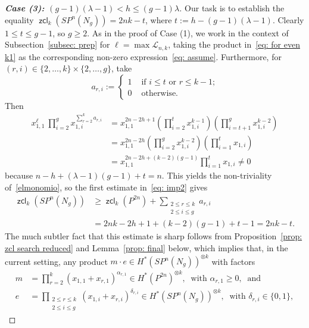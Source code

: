 \documentclass[amscd,amssymb,verbatim,10pt]{amsart}
\numberwithin{equation}{section}
\theoremstyle{plain}
\theoremstyle{definition}
\DeclareMathOperator{\zcl}{{\mathsf{zcl}}}
\begin{document}
\begin{proof}[\textbf{Case (3): $(g-1)(\lambda-1)<h\le (g-1)\lambda$}]
Our task is to establish the equality $\zcl_k(SP^n(N_g))=2nk-t$, where $t:=h-(g-1)(\lambda-1)$. Clearly $1\leq t\leq g-1$, so $g\geq2$. As in the proof of Case (1), we work in the context of Subsection~\ref{subsec: prep} for $\ell=\max\mathcal{L}_{n,k}$, taking the product in~\eqref{eq: for even k1} as the corresponding non-zero expression~\eqref{eq: assume}. Furthermore, for $(r,i)\in\{2,\ldots,k\}\times\{2,\ldots,g\}$, take
   \[
a_{r,i}:=\begin{cases}
1 & \text{ if $i\leq t$ or $r\le k-1$;} \\
0 & \text{ otherwise.}
\end{cases}
   \]
Then
\begin{align*}
x_{1,1}^{\ell}\ \prod_{i=2}^gx_{1,i}^{\sum_{r=2}^{k}a_{r,i}}&=x_{1,1}^{2n-2h+1}\left(\prod_{i=2}^tx_{1,i}^{k-1}\right)\left( \prod_{i=t+1}^gx_{1,i}^{k-2}\right)\\
&= x_{1,1}^{2n-2h}\left(\prod_{i=2}^gx_{1,i}^{k-2}\right)\left(\prod_{i=1}^tx_{1,i}\right) \\
&=x_{1,1}^{2n-2h+(k-2)(g-1)} \prod_{i=1}^tx_{1,i}\ne 0
\end{align*}
    because $n-h+(\lambda-1)(g-1)+t=n$. This yields the non-triviality of~\eqref{elmonomio}, so the first estimate in~\eqref{eq: imp2} gives
    \begin{align*}
    \zcl_k(SP^n(N_g))&\ge \zcl_k( P^{2n} )+ \sum_{\substack{2\le r\le k \\ 2\le i \le g}}a_{r,i} \\ &= 2nk-2h+1+(k-2)(g-1)+t-1 = 2nk-t.
    \end{align*}
The much subtler fact that this estimate is sharp  follows from Proposition~\ref{prop: zcl search reduced} and Lemma~\ref{prop: final} below, which implies that, in the current setting, any product $m\cdot e \in H^*(SP^n(N_g))^{\otimes k}$ with factors
\begin{align} 
m&=\prod_{r=2}^k\left(x_{1,1}+x_{r,1}\right)^{\alpha_{r,1}} \in H^*(P^{2n})^{\otimes k}, \ \text{ with $\alpha_{r,1}\geq0$},\ \text{ and} \nonumber \\
e&=\prod_{\substack{2\le r\le k\\ 2\le i \le g}}\left(x_{1,i}+x_{r,i}\right)^{\delta_{r,i}} \in H^*(SP^n(N_g))^{\otimes k}, \ \text{ with $\delta_{r,i}\in\{0,1\}$}, \label{eq: e0}   \end{align}

\end{proof}
\end{document}

